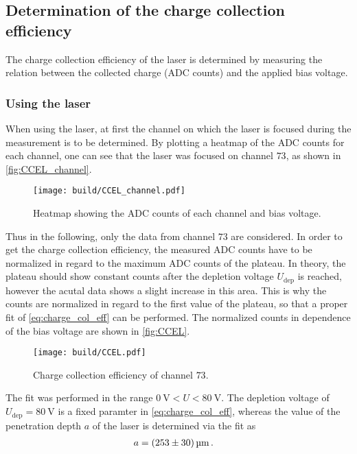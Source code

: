 \subsection{Determination of the charge collection efficiency}

The charge collection efficiency of the laser is determined by measuring the relation between the
collected charge (ADC counts) and the applied bias voltage.

\subsubsection{Using the laser}

When using the laser, at first the channel on which the laser is focused during the measurement is to
be determined. By plotting a heatmap of the ADC counts for each channel, one can see
that the laser was focused on channel $73$, as shown in \autoref{fig:CCEL_channel}.

\begin{figure}[H]
  \centering
  \texttt{[image: build/CCEL\_channel.pdf]}
  \caption{Heatmap showing the ADC counts of each channel and bias voltage.}
  \label{fig:CCEL_channel}
\end{figure}

Thus in the following, only the data from channel $73$ are considered. In order to get the
charge collection efficiency, the measured ADC counts
have to be normalized in regard to the maximum ADC counts of the plateau.
In theory, the plateau should show constant counts after the depletion voltage $U_{\text{dep}}$ is reached,
however the acutal data shows a slight increase in this area. This is why the counts
are normalized in regard to the first value of the plateau, so that a proper fit of 
\eqref{eq:charge_col_eff} can be performed. The normalized counts in dependence of the
bias voltage are shown in \autoref{fig:CCEL}.

\begin{figure}[H]
  \centering
  \texttt{[image: build/CCEL.pdf]}
  \caption{Charge collection efficiency of channel $73$.}
  \label{fig:CCEL}
\end{figure}

The fit was performed in the range $\qty{0}{\volt} < U < \qty{80}{\volt}$.
The depletion voltage of $U_{\text{dep}} = \qty{80}{\volt}$ is a fixed paramter in 
\eqref{eq:charge_col_eff}, whereas the value of the penetration depth $a$ of the laser is determined
via the fit as
\begin{align*}
  a &= \qty{253+-30}{\micro\meter} \, .
\end{align*}

